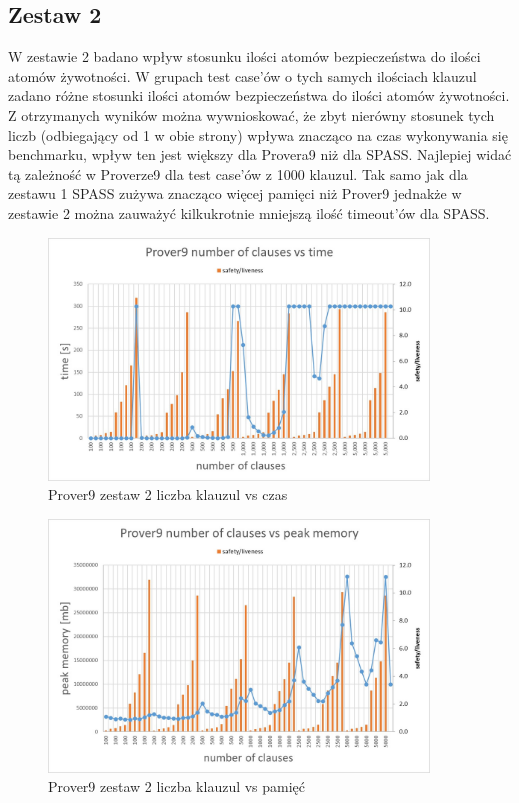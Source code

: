 \documentclass[a4paper,12pt]{article}
\begin{document}
\subsection{Zestaw 2}

W zestawie 2 badano wpływ stosunku ilości atomów bezpieczeństwa do ilości atomów żywotności. W grupach test case'ów o tych samych ilościach klauzul zadano różne stosunki ilości atomów bezpieczeństwa do ilości atomów żywotności. Z otrzymanych wyników można wywnioskować, że zbyt nierówny stosunek tych liczb (odbiegający od 1 w obie strony) wpływa znacząco na czas wykonywania się benchmarku, wpływ ten jest większy dla Provera9 niż dla SPASS. Najlepiej widać tą zależność w Proverze9 dla test case'ów z 1000 klauzul. Tak samo jak dla zestawu 1 SPASS zużywa znacząco więcej pamięci niż Prover9 jednakże w zestawie 2 można zauważyć kilkukrotnie mniejszą ilość timeout'ów dla SPASS.

\begin{figure}[H]
  \centerline{\includegraphics[width=0.9\textwidth]{outputs/set2/set2 charts/01 Prover9 number of clauses vs time.jpg}}
  \caption{Prover9 zestaw 2 liczba klauzul vs czas}
\end{figure}

\begin{figure}[H]
  \centerline{\includegraphics[width=0.9\textwidth]{outputs/set2/set2 charts/02 Prover9 number of clauses vs peak memory.jpg}}
  \caption{Prover9 zestaw 2 liczba klauzul vs pamięć}
\end{figure}
\end{document}
